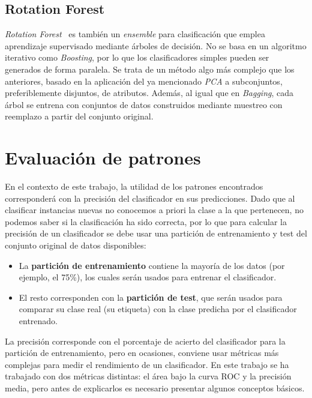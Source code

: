 \subsection{Rotation Forest}

\textit{Rotation Forest}~\cite{rodriguez2006rotation} es también un \textit{ensemble} para clasificación que emplea aprendizaje supervisado mediante árboles de decisión. No se basa en un algoritmo iterativo como \textit{Boosting}, por lo que los clasificadores simples pueden ser generados de forma paralela. Se trata de un método algo más complejo que los anteriores, basado en la aplicación del ya mencionado \textit{PCA} a subconjuntos, preferiblemente disjuntos, de atributos. Además, al igual que en \textit{Bagging}, cada árbol se entrena con conjuntos de datos construidos mediante muestreo con reemplazo a partir del conjunto original. 

\section{Evaluación de patrones}

En el contexto de este trabajo, la utilidad de los patrones encontrados corresponderá con la precisión del clasificador en sus predicciones. Dado que al clasificar instancias nuevas no conocemos a priori la clase a la que pertenecen, no podemos saber si la clasificación ha sido correcta, por lo que para calcular la precisión de un clasificador se debe usar una partición de entrenamiento y test del conjunto original de datos disponibles: 

\begin{minipage}{\linewidth}
\begin{itemize}
	\item La \textbf{partición de entrenamiento} contiene la mayoría de los datos (por ejemplo, el 75\%), los cuales serán usados para entrenar el clasificador. 
	\item El resto corresponden con la \textbf{partición de test}, que serán usados para comparar su clase real (su etiqueta) con la clase predicha por el clasificador entrenado.
\end{itemize} 
\end{minipage} 

La precisión corresponde con el porcentaje de acierto del clasificador para la partición de entrenamiento, pero en ocasiones, conviene usar métricas más complejas para medir el rendimiento de un clasificador. En este trabajo se ha trabajado con dos métricas distintas: el área bajo la curva ROC y la precisión media, pero antes de explicarlos es necesario presentar algunos conceptos básicos.  

